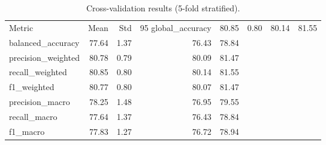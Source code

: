 \begin{table}
\caption{Cross-validation results (5-fold stratified).}
\label{tab:cv_results}
\begin{tabular}{lrrrr}
\toprule
Metric & Mean & Std & 95%
\midrule
global_accuracy & 80.85 & 0.80 & 80.14 & 81.55 \\
balanced_accuracy & 77.64 & 1.37 & 76.43 & 78.84 \\
precision_weighted & 80.78 & 0.79 & 80.09 & 81.47 \\
recall_weighted & 80.85 & 0.80 & 80.14 & 81.55 \\
f1_weighted & 80.77 & 0.80 & 80.07 & 81.47 \\
precision_macro & 78.25 & 1.48 & 76.95 & 79.55 \\
recall_macro & 77.64 & 1.37 & 76.43 & 78.84 \\
f1_macro & 77.83 & 1.27 & 76.72 & 78.94 \\
\bottomrule
\end{tabular}
\end{table}
